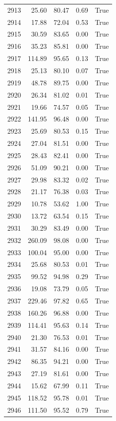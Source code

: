 \begin{longtable}{rrrrr}
2913 & 25.60 & 80.47 & 0.69 & True \\
2914 & 17.88 & 72.04 & 0.53 & True \\
2915 & 30.59 & 83.65 & 0.00 & True \\
2916 & 35.23 & 85.81 & 0.00 & True \\
2917 & 114.89 & 95.65 & 0.13 & True \\
2918 & 25.13 & 80.10 & 0.07 & True \\
2919 & 48.78 & 89.75 & 0.00 & True \\
2920 & 26.34 & 81.02 & 0.01 & True \\
2921 & 19.66 & 74.57 & 0.05 & True \\
2922 & 141.95 & 96.48 & 0.00 & True \\
2923 & 25.69 & 80.53 & 0.15 & True \\
2924 & 27.04 & 81.51 & 0.00 & True \\
2925 & 28.43 & 82.41 & 0.00 & True \\
2926 & 51.09 & 90.21 & 0.00 & True \\
2927 & 29.98 & 83.32 & 0.02 & True \\
2928 & 21.17 & 76.38 & 0.03 & True \\
2929 & 10.78 & 53.62 & 1.00 & True \\
2930 & 13.72 & 63.54 & 0.15 & True \\
2931 & 30.29 & 83.49 & 0.00 & True \\
2932 & 260.09 & 98.08 & 0.00 & True \\
2933 & 100.04 & 95.00 & 0.00 & True \\
2934 & 25.68 & 80.53 & 0.01 & True \\
2935 & 99.52 & 94.98 & 0.29 & True \\
2936 & 19.08 & 73.79 & 0.05 & True \\
2937 & 229.46 & 97.82 & 0.65 & True \\
2938 & 160.26 & 96.88 & 0.00 & True \\
2939 & 114.41 & 95.63 & 0.14 & True \\
2940 & 21.30 & 76.53 & 0.01 & True \\
2941 & 31.57 & 84.16 & 0.00 & True \\
2942 & 86.35 & 94.21 & 0.00 & True \\
2943 & 27.19 & 81.61 & 0.00 & True \\
2944 & 15.62 & 67.99 & 0.11 & True \\
2945 & 118.52 & 95.78 & 0.01 & True \\
2946 & 111.50 & 95.52 & 0.79 & True \\

\end{longtable}
